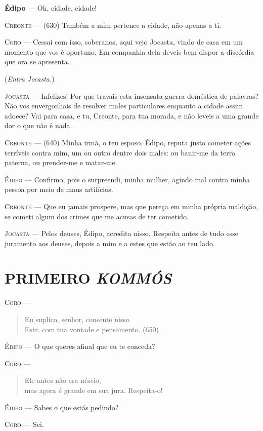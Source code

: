 \textbf{Édipo} --- Oh, cidade, cidade!

\textsc{Creonte} --- (630) Também a mim pertence a cidade, não apenas a ti.

\textsc{Coro} --- Cessai com isso, soberanos, aqui vejo Jocasta, vindo de casa em um
momento que vos é oportuno. Em companhia dela deveis bem dispor a
discórdia que ora se apresenta.

(\emph{Entra Jocasta.})

\textsc{Jocasta} --- Infelizes! Por que travais esta insensata guerra doméstica de palavras?
Não vos envergonhais de resolver males particulares enquanto a cidade
assim adoece? Vai para casa, e tu, Creonte, para tua morada, e não
leveis a uma grande dor o que não é nada.

\textsc{Creonte} --- (640) Minha irmã, o teu esposo, Édipo, reputa justo cometer ações
terríveis contra mim, um ou outro dentre dois males: ou banir-me da
terra paterna, ou prender-me e matar-me.

\textsc{Édipo} --- Confirmo, pois o surpreendi, minha mulher, agindo mal contra minha
pessoa por meio de maus artifícios.

\textsc{Creonte} --- Que eu jamais prospere, mas que pereça em minha própria maldição, se
cometi algum dos crimes que me acusas de ter cometido.

\textsc{Jocasta} --- Pelos deuses, Édipo, acredita nisso. Respeita antes de tudo esse
juramento aos deuses, depois a mim e a estes que estão ao teu lado.

\section{PRIMEIRO \emph{KOMMÓS}}

\textsc{Coro} --- \begin{verse}Eu suplico, senhor, consente nisso\\ Estr.
com tua vontade e pensamento. (650)
\end{verse}

\textsc{Édipo} --- O que queres afinal que eu te conceda?

\textsc{Coro} --- \begin{verse}Ele antes não era néscio,\\
mas agora é grande em sua jura. Respeita-o!
\end{verse}

\textsc{Édipo} --- Sabes o que estás pedindo?

\textsc{Coro} --- Sei.

